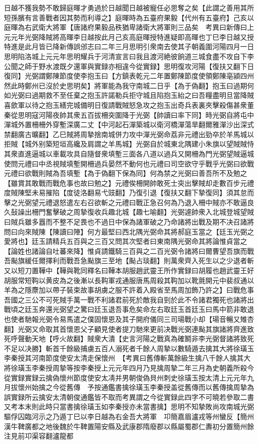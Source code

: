 日越不獲我勢不敢歸庭暉才勇過於日越聞日越被寵任必思奪之矣【此謂之善用其所短孫臏有言善戰者因其勢而利導之】庭暉時為五臺府果毅【代州有五臺府】己亥以庭暉為右武衛大將軍【唐諸府果毅品秩猶卑諸衛大將軍則三品矣　考異曰新傳曰上元元年光弼降賊將高暉李日越按此月己亥高庭暉授特進疑即高暉也丁巳李日越又授特進是此月皆已降新傳誤邠志曰二年三月思明引衆南去使其子朝義圍河陽四月一日思明陷洛城上元元年思明耀兵于河清宣言曰我且渡河絶彼餉道三城食盡不攻自下李公聞之師于野水渡既夕還軍與實録亦相違今從實録】思明復攻河陽【復扶又翻下日復同】光弼謂鄭陳節度使李抱玉曰【方鎮表乾元二年置鄭陳節度使領鄭陳亳潁四州然此時鄭州已沒於史思明矣】將軍能為我守南城二日乎【為于偽翻】抱玉曰過期何如光弼曰過期救不至任棄之抱玉許諾勒兵拒守城且陷抱玉紿之曰吾糧盡明旦當降賊喜歛軍以待之抱玉繕完城備明日復請戰賊怒急攻之抱玉出奇兵表裏夾擊殺傷甚衆董秦從思明寇河陽夜帥其衆五百拔柵突圍降于光弼【帥讀曰率下同】時光弼自將屯中潬城外置柵柵外穿塹深廣二丈【中河起石潬築城以衛河橋潬蕩旱翻爾雅潬沙出深式禁翻廣古曠翻】乙巳賊將周摯捨南城併力攻中潬光弼命荔非元禮出勁卒於羊馬城以拒賊【城外别築短垣高纔及肩謂之羊馬城】光弼自於城東北隅建小朱旗以望賊賊恃其衆直進逼城以車載攻具自隨督衆填塹三面各八道以過兵又開柵為門光弼望賊逼城使問元禮曰中丞視賊填塹開柵過兵晏然不動何也元禮曰司空欲守乎戰乎光弼曰欲戰元禮曰欲戰則賊為吾填塹【為于偽翻下保為同】何為禁之光弼曰善吾所不及勉之【雖賞其敢戰而戰危事也故曰勉之】元禮俟柵開帥敢死士突出擊賊却走數百步元禮度賊陳堅未易摧陷【度徒洛翻易弋豉翻】乃復引退【復扶又翻下摯復同】須其怠而擊之光弼望元禮退怒遣左右召欲斬之元禮曰戰正急召何為乃退入柵中賊亦不敢逼良久鼔譟出柵門奮擊破之周摯復收兵趣北城【趣七喻翻】光弼遽帥衆入北城登城望賊曰賊兵雖多囂而不整不足畏也不過日中保為諸軍破之乃命諸將出戰及期不决召諸將問曰向來賊陳【陳讀曰陣】何方最堅曰西北隅光弼命其將郝庭玉當之【廷玉光弼之愛將也】廷玉請精兵五百與之三百又問其次堅者曰東南隅光弼命其將論惟貞當之【論姓也諸論自吐蕃來降】惟貞請鐵騎三百與之二百光弼令諸將曰爾曹望吾旗而戰吾颭旗緩任爾擇利而戰吾急颭旗三至地【颭占琰翻】則萬衆齊入死生以之少退者斬又以短刀置鞾中【鞾與靴同釋名曰鞾本胡服趙武靈王所作實録曰胡履也趙武靈王好胡服常短䩓以黄皮為之後漸以長䩓軍戎通服唐馬周殺其䩓加以靴氈開元中裴叔通以羊為之隱麖加以帶子裝束故事胡虜之服不許着入殿省至馬周加飾乃許之】曰戰危事吾國之三公不可死賊手萬一戰不利諸君前死於敵我自剄於此不令諸君獨死也諸將出戰頃之廷玉奔還光弼望之驚曰廷玉退吾事危矣命左右取廷玉首廷玉曰馬中箭非敢退也使者馳報光弼令易馬遣之僕固懷恩及其子開府儀同三司瑒戰小却【瑒音暢又雉杏翻】光弼又命取其首懷恩父子顧見使者提刀馳來更前决戰光弼連颭其旗諸將齊進致死呼聲動天地【呼火故翻】賊衆大潰【史言河陽之戰真為確鬭非李光弼督諸將致死不足以决勝】斬首千餘級捕虜五百人溺死者千餘人周摯以數騎遁去擒其大將徐璜玉李秦授其河南節度使安太清走保懷州　【考異曰舊傳斬萬餘級生擒八千餘人擒其大將徐璜玉李秦授周摯等按李秦授上元元年四月乃見擒周摯二年三月為史朝義所殺今從實録實録云擒偽懷州節度使安太凊并男朝俊偽貝州刺史徐璜玉按太清上元元年九月拔懷州始擒之今從舊傳　予按通鑑書擒徐璜玉李秦授盖從舊傳而以舊傳擒周摯為誤實録所云擒安太清朝俊通鑑皆不取而考異謂之今從實録此四字不可曉若參取二書又考本末則此時只當書擒徐璜玉如李秦授亦未當書擒】思明不知摯敗尚攻南城光弼驅俘囚臨河示之乃遁丁巳以李日越為右金吾大將軍　卭簡嘉眉瀘戎等州蠻反【簡州漢牛鞞廣都之地後魏於牛鞞置陽安縣及武康郡隋廢郡以縣屬蜀郡仁夀初分置簡州餘注見前卭渠容翻瀘龍都